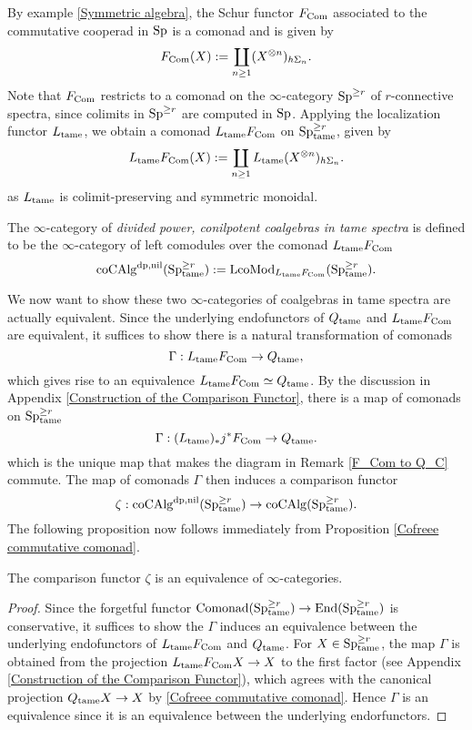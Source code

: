 By example \ref{Symmetric algebra}, the Schur functor $F_{\operatorname{Com}}$ associated to the commutative cooperad in $\operatorname{Sp}$ is a comonad and is given by
$$
F_{\operatorname{Com}}(X) := \coprod_{n\geq 1} (X^{\otimes n})_{h\Sigma_n}.
$$
Note that $F_{\operatorname{Com}}$ restricts to a comonad on the $\infty$-category $\operatorname{Sp}^{\geq r}$ of $r$-connective spectra, since colimits in $\operatorname{Sp}^{\geq r}$ are computed in $\operatorname{Sp}$.
Applying the localization functor $L_{\operatorname{\operatorname{tame}}}$, we obtain a comonad $L_{\operatorname{\operatorname{tame}}}F_{\operatorname{Com}}$ on $\operatorname{Sp}_{\operatorname{\operatorname{tame}}}^{\geq r}$, given by 
$$
L_{\operatorname{\operatorname{tame}}} F_{\operatorname{Com}}(X) := \coprod_{n\geq 1} L_{\operatorname{\operatorname{tame}}}(X^{\otimes n})_{h\Sigma_n}.
$$
as $L_{\operatorname{\operatorname{tame}}}$ is colimit-preserving and symmetric monoidal.


\begin{definition}
\label{Def of tame dp, nil coalgebras}
    The $\infty$-category of \emph{divided power, conilpotent coalgebras in tame spectra} is defined to be the $\infty$-category of left comodules over the comonad $L_{\operatorname{\operatorname{tame}}}F_{\operatorname{Com}}$
    \[
    \operatorname{coCAlg}^{\operatorname{dp}, \operatorname{nil}}(\operatorname{Sp}_{\operatorname{\operatorname{tame}}}^{\geq r}):= \operatorname{LcoMod}_{L_{\operatorname{\operatorname{tame}}}F_{\operatorname{Com}}}(\operatorname{Sp}_{\operatorname{\operatorname{tame}}}^{\geq r}).
    \]
\end{definition}
We now want to show these two $\infty$-categories of coalgebras in tame spectra are actually equivalent. 
Since the underlying endofunctors of $Q_{\operatorname{\operatorname{tame}}}$ and $L_{\operatorname{\operatorname{tame}}}F_{\operatorname{Com}}$ are equivalent, it suffices to show there is a natural transformation of comonads
$$
\Gamma: L_{\operatorname{\operatorname{tame}}}F_{\operatorname{Com}}\to 
Q_{\operatorname{\operatorname{tame}}},
$$
which gives rise to an equivalence $L_{\operatorname{\operatorname{tame}}}F_{\operatorname{Com}}\simeq Q_{\operatorname{\operatorname{tame}}}$.
By the discussion in Appendix \ref{Construction of the Comparison Functor}, there is a map of comonads on $\operatorname{Sp}^{\geq r}_{\operatorname{\operatorname{tame}}}$
$$
\Gamma: (L_{\operatorname{\operatorname{tame}}})_{*} j^{*} F_{\operatorname{Com}} \to Q_{\operatorname{\operatorname{tame}}}.
$$
which is the unique map that makes the diagram in Remark \ref{F_Com to Q_C} commute.
The map of comonads $\Gamma$ then induces a comparison functor 
$$
\zeta:\operatorname{coCAlg}^{\operatorname{dp},\operatorname{nil}}(\operatorname{Sp}^{\geq r}_{\operatorname{\operatorname{tame}}}) \to
\operatorname{coCAlg}(\operatorname{Sp}^{\geq r}_{\operatorname{\operatorname{tame}}}).
$$
The following proposition now follows immediately from Proposition \ref{Cofreee commutative comonad}.
\begin{proposition}
\label{all coalgebras are equivalent}
	The comparison functor $\zeta$ is an equivalence of $\infty$-categories.
\end{proposition}
\begin{proof}
Since the forgetful functor $\operatorname{Comonad}(\operatorname{Sp}^{\geq r}_{\operatorname{\operatorname{tame}}}) \to \operatorname{End}(\operatorname{Sp}^{\geq r}_{\operatorname{\operatorname{tame}}})$ is conservative,
it suffices to show the $\Gamma$ induces an equivalence between the underlying endofunctors of $L_{\operatorname{\operatorname{tame}}}F_{\operatorname{Com}}$ and $Q_{\operatorname{\operatorname{tame}}}$. For $X\in \operatorname{Sp}^{\geq r}_{\operatorname{\operatorname{tame}}}$, the map $\Gamma$ is obtained from the projection $L_{\operatorname{\operatorname{tame}}}F_{\operatorname{Com}}X \to X$ to the first factor (see Appendix \ref{Construction of the Comparison Functor}), which agrees with the canonical projection $Q_{\operatorname{\operatorname{tame}}}X\to X$ by \ref{Cofreee commutative comonad}. Hence $\Gamma$ is an equivalence since it is an equivalence between the underlying endorfunctors.

\end{proof}




